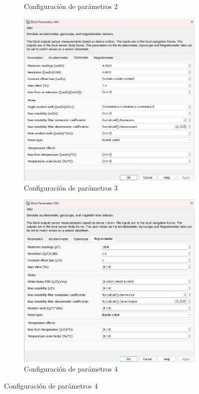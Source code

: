 \begin{figure}[htbp]
\begin{subfigure}[b]{0.45\textwidth}
        \caption{Configuración de parámetros 2}
        \label{fig:parametros_IMU_02}
    \end{subfigure}
    \hfill
    \begin{subfigure}[b]{0.45\textwidth}
        \centering
        \includegraphics[width=\textwidth]{fig/Capitulo5/Caso_de_estudio_IMU/Generador_de_archivos/configuracion_parametros_IMU_03.png}
        \caption{Configuración de parámetros 3}
        \label{fig:parametros_IMU_03}
    \end{subfigure}
    \hfill
    \begin{subfigure}[b]{0.45\textwidth}
        \centering
        \includegraphics[width=\textwidth]{fig/Capitulo5/Caso_de_estudio_IMU/Generador_de_archivos/configuracion_parametros_IMU_04.png}
        \caption{Configuración de parámetros 4}
        \label{fig:parametros_IMU_04}
    \end{subfigure}


\end{figure}
